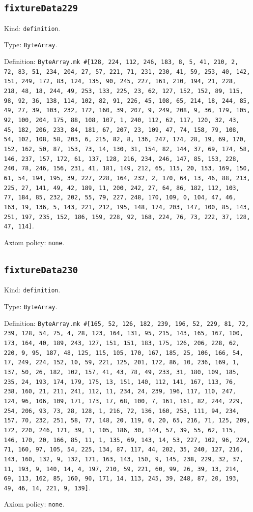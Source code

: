 \documentclass[11pt]{article}
\begin{document}
\subsection*{\texttt{fixtureData229}}
\noindent Kind: \texttt{definition}.\par
\noindent Type: \texttt{ByteArray}.\par
\noindent Definition: \texttt{ByteArray.mk \#[128, 224, 112, 246, 183, 8, 5, 41, 210, 2, 72, 83, 51, 234, 204, 27, 57, 221, 71, 231, 230, 41, 59, 253, 40, 142, 151, 249, 172, 83, 124, 135, 90, 245, 227, 161, 210, 194, 21, 228, 218, 48, 18, 244, 49, 253, 133, 225, 23, 62, 127, 152, 152, 89, 115, 98, 92, 36, 138, 114, 102, 82, 91, 226, 45, 108, 65, 214, 18, 244, 85, 49, 27, 39, 103, 232, 172, 160, 39, 207, 9, 249, 208, 9, 36, 179, 105, 92, 100, 204, 175, 88, 108, 107, 1, 240, 112, 62, 117, 120, 32, 43, 45, 182, 206, 233, 84, 181, 67, 207, 23, 109, 47, 74, 158, 79, 108, 54, 102, 108, 58, 203, 6, 215, 82, 8, 136, 247, 174, 28, 19, 69, 170, 152, 162, 50, 87, 153, 73, 14, 130, 31, 154, 82, 144, 37, 69, 174, 58, 146, 237, 157, 172, 61, 137, 128, 216, 234, 246, 147, 85, 153, 228, 240, 78, 246, 156, 231, 41, 181, 149, 212, 65, 115, 20, 153, 169, 150, 61, 54, 194, 195, 39, 227, 228, 164, 232, 2, 170, 64, 13, 46, 88, 213, 225, 27, 141, 49, 42, 189, 11, 200, 242, 27, 64, 86, 182, 112, 103, 77, 184, 85, 232, 202, 55, 79, 227, 248, 170, 109, 0, 104, 47, 46, 163, 19, 136, 5, 143, 221, 212, 195, 148, 174, 203, 147, 100, 85, 143, 251, 197, 235, 152, 186, 159, 228, 92, 168, 224, 76, 73, 222, 37, 128, 47, 114]}.\par
\noindent Axiom policy: \texttt{none}.\par
\subsection*{\texttt{fixtureData230}}
\noindent Kind: \texttt{definition}.\par
\noindent Type: \texttt{ByteArray}.\par
\noindent Definition: \texttt{ByteArray.mk \#[165, 52, 126, 182, 239, 196, 52, 229, 81, 72, 239, 128, 54, 75, 4, 28, 123, 164, 131, 95, 215, 143, 165, 167, 100, 173, 164, 40, 189, 243, 127, 151, 151, 183, 175, 126, 206, 228, 62, 220, 9, 95, 187, 48, 125, 115, 105, 170, 167, 185, 25, 106, 166, 54, 17, 249, 224, 152, 10, 59, 221, 125, 201, 172, 86, 10, 236, 169, 1, 137, 50, 26, 182, 102, 157, 41, 43, 78, 49, 233, 31, 180, 109, 185, 235, 24, 193, 174, 179, 175, 13, 151, 140, 112, 141, 167, 113, 76, 238, 160, 21, 211, 241, 112, 11, 234, 24, 239, 196, 117, 110, 247, 124, 96, 106, 109, 171, 173, 17, 68, 100, 7, 161, 161, 82, 244, 229, 254, 206, 93, 73, 28, 128, 1, 216, 72, 136, 160, 253, 111, 94, 234, 157, 70, 232, 251, 58, 77, 148, 20, 119, 0, 20, 65, 216, 71, 125, 209, 172, 220, 246, 171, 39, 1, 105, 186, 30, 144, 57, 39, 55, 62, 115, 146, 170, 20, 166, 85, 11, 1, 135, 69, 143, 14, 53, 227, 102, 96, 224, 71, 160, 97, 105, 54, 225, 134, 87, 117, 44, 202, 35, 240, 127, 216, 143, 160, 132, 9, 132, 171, 163, 143, 150, 9, 145, 238, 229, 32, 37, 11, 193, 9, 140, 14, 4, 197, 210, 59, 221, 60, 99, 26, 39, 13, 214, 69, 113, 162, 85, 160, 90, 171, 14, 113, 245, 39, 248, 87, 20, 193, 49, 46, 14, 221, 9, 139]}.\par
\noindent Axiom policy: \texttt{none}.\par
\end{document}

